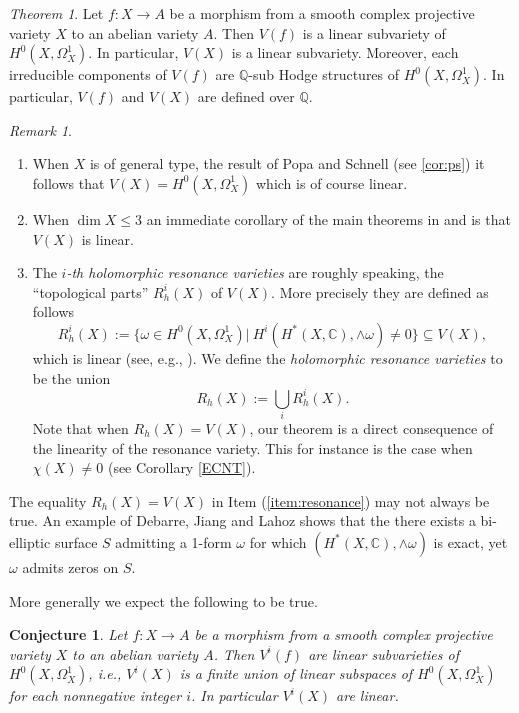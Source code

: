 \documentclass[a4paper,12pt,reqno]{amsart}
\theoremstyle{plain}
\newtheorem{conjecture}[theorem]{Conjecture}
\theoremstyle{remark}
\newtheorem{remark}[theorem]{Remark}
\newcommand{\Q}{\mathbb Q}
\newtheorem{alphtheorem}{Theorem}
\begin{document}
\begin{alphtheorem}\label{main1}
Let $f: X\to A$ be a morphism from a smooth complex projective variety $X$ to an abelian variety $A$. Then 
$V(f)$ is a linear subvariety of $H^0(X, \Omega_X^1)$. In particular, $V(X)$ is a linear subvariety. Moreover, each irreducible components of $V(f)$ are $\Q$-sub Hodge structures of $H^0(X, \Omega_X^1)$. In particular, $V(f)$ and $V(X)$ are defined over $\Q$.

\end{alphtheorem}
\begin{remark}
\begin{enumerate}
	\item When $X$ is of general type, the 
	result of Popa and Schnell (see \ref{cor:ps}) 
	it follows that $V(X) = H^0(X,\Omega_X^1)$ which is of course
	linear. 
	\item  When $\dim X\leq 3$ an immediate corollary of the main theorems in \cite{SS19} and \cite{HS19} is that $V(X)$ is linear.
	\item \label{item:resonance} The \emph{$i$-th holomorphic resonance varieties} are roughly speaking, the ``topological parts'' $R_h^i(X)$ of $V(X)$.
	More precisely they are defined as follows
	\[R_h^i(X):=\{\omega\in H^0(X, \Omega_X^1)|\ H^i(H^*(X, \mathbb{C}), \wedge \omega)\not= 0\}\subseteq V(X),\]
	which is linear (see, e.g., \cite{DiPa13}). We define the \emph{holomorphic resonance varieties} to be the union $$R_h(X):=\bigcup_{i} R_h^i(X).$$ Note that
	when
	$R_h(X) = V(X)$, our theorem is a direct consequence of
	the linearity of the resonance variety. This 
	for instance is the case when $\chi(X)\not=0$ (see Corollary \ref{ECNT}). 
\end{enumerate}

\end{remark}
The equality $R_h(X) = V(X)$ in Item (\ref{item:resonance}) may not always be true. An example of Debarre, Jiang and Lahoz 
\cite[Example 1.11]{DJL17} shows that the
there exists a bi-elliptic surface $S$ admitting a 1-form 
$\omega$ for which $(H^*(X, \mathbb{C}), \wedge \omega)$
is exact, yet $\omega$ admits zeros on $S$. 

More generally we expect the following to be true.
\begin{conjecture} \label{linear-vi}
Let $f: X\to A$ be a morphism from a smooth complex projective variety $X$ to an abelian variety $A$. Then $V^i(f)$ are linear subvarieties of $H^0(X, \Omega_X^1)$, i.e., $V^i(X)$ is a finite union of linear subspaces of $H^0(X, \Omega_X^1)$ for each nonnegative integer $i$. In particular $V^i(X)$ are linear.
\end{conjecture}
\end{document}
